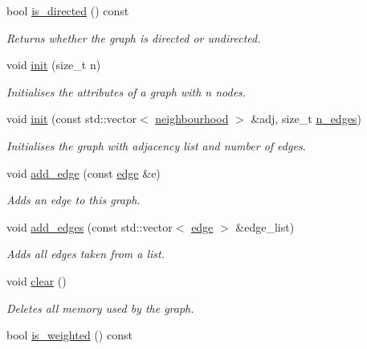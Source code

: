 \begin{DoxyCompactItemize}
bool \hyperlink{classlgraph_1_1udgraph_a0dbdc44bb09e94a80005cf183de00e58}{is\-\_\-directed} () const 
\begin{DoxyCompactList}\small\item\em Returns whether the graph is directed or undirected. \end{DoxyCompactList}\item 
void \hyperlink{classlgraph_1_1uxgraph_a539e735d68b55ce01d733262c9db34d5}{init} (size\-\_\-t n)
\begin{DoxyCompactList}\small\item\em Initialises the attributes of a graph with {\itshape n} nodes. \end{DoxyCompactList}\item 
void \hyperlink{classlgraph_1_1uxgraph_ab0e84975aa8048e6d93622d1b4e0c567}{init} (const std\-::vector$<$ \hyperlink{namespacelgraph_a052e7766c13f3a43cec0aec8173fdede}{neighbourhood} $>$ \&adj, size\-\_\-t \hyperlink{classlgraph_1_1xxgraph_a8ca991d1521cb6ba77e1cd3494ab42be}{n\-\_\-edges})
\begin{DoxyCompactList}\small\item\em Initialises the graph with adjacency list and number of edges. \end{DoxyCompactList}\item 
void \hyperlink{classlgraph_1_1uxgraph_a1a826ff50563bc4021e16d712f309232}{add\-\_\-edge} (const \hyperlink{namespacelgraph_a76bd7d50719f03de7a85db259d80d572}{edge} \&e)
\begin{DoxyCompactList}\small\item\em Adds an edge to this graph. \end{DoxyCompactList}\item 
void \hyperlink{classlgraph_1_1uxgraph_ad20f841d6bb1147d087546c6054c55f3}{add\-\_\-edges} (const std\-::vector$<$ \hyperlink{namespacelgraph_a76bd7d50719f03de7a85db259d80d572}{edge} $>$ \&edge\-\_\-list)
\begin{DoxyCompactList}\small\item\em Adds all edges taken from a list. \end{DoxyCompactList}\item 
void \hyperlink{classlgraph_1_1uxgraph_aad397c98fd1f144350e4418971319a97}{clear} ()
\begin{DoxyCompactList}\small\item\em Deletes all memory used by the graph. \end{DoxyCompactList}\item 
\hypertarget{classlgraph_1_1uxgraph_a08952515aec4a03dc9fbbfef5e5d35b8}{bool \hyperlink{classlgraph_1_1uxgraph_a08952515aec4a03dc9fbbfef5e5d35b8}{is\-\_\-weighted} () const }\label{classlgraph_1_1uxgraph_a08952515aec4a03dc9fbbfef5e5d35b8}


\end{DoxyCompactItemize}
